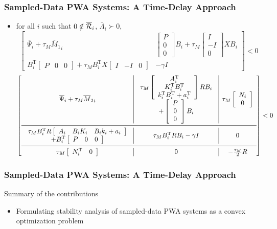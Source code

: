 \documentclass{beamer}
\newcommand{\TR}{\text{T}}
\newcommand{\RR}{{\cal R}}
\newcommand{\beq}{\begin{equation*}}
\newcommand{\eeq}{\end{equation*}}
\newcommand{\bmat}{\left[\begin{array}}
\newcommand{\emat}{\end{array}\right]}
\begin{document}
  \frame
  {  
    \frametitle{Sampled-Data PWA Systems: A Time-Delay Approach}
\begin{itemize}
\item for all $i$ such that $0\notin\overline\RR_i$, $\bar\Lambda_i\succ0$,
{\scriptsize 
\beq
\bmat{cc}\overline \Psi_i+\tau_M {\overline M_1}_i&\bmat{c}P\\0\\0\emat B_i+\tau_M\bmat{c}I\\-I\\0\emat X B_i\\B_i^\TR\bmat{ccc}P&0&0\emat+\tau_M B_i^\TR X\bmat{ccc}I&-I&0\emat&-\gamma I\emat<0
\eeq
\beq
\bmat{c|c|c}
\overline\Psi_i+\tau_M {\overline M_2}_i&\begin{array}{c}\tau_M\bmat{c}A_i^\TR\\K_i^\TR B_i^\TR\\k_i^\TR B_i^\TR +a_i^\TR\emat R B_i\\+\bmat{c}P\\0\\0\emat B_i\end{array}&\tau_M \bmat{c}N_i\\0\emat\\\noalign{\smallskip\hrule\smallskip}
\begin{array}{c}\tau_M B_i^\TR R \bmat{ccc} A_i & B_i K_i&B_i k_i+a_i \emat\\+B_i^\TR\bmat{ccc}P&0&0\emat\end{array} & \tau_M B_i^\TR R B_i-\gamma I & 0\\\noalign{\smallskip\hrule\smallskip}
\tau_M \bmat{cc}N_i^\TR&0\emat & 0 & -\frac{\tau_M}{2} R
\emat<0
\eeq}
\end{itemize}
}

  \frame
  {  
    \frametitle{Sampled-Data PWA Systems: A Time-Delay Approach}
	Summary of the contributions
    \begin{itemize}
    \item Formulating stability analysis of sampled-data PWA systems as a convex optimization problem
   \end{itemize}
  }
\end{document}
